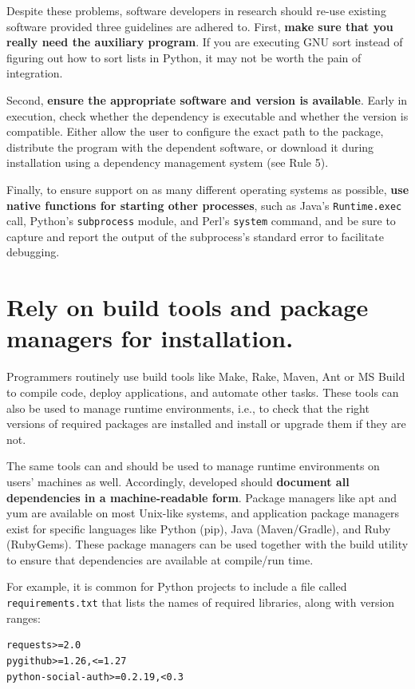 \documentclass[10pt,letterpaper]{article}
\begin{document}
Despite these problems, software developers in research should
re-use existing software provided three guidelines are adhered to.
First, 
\textbf{make sure that you really need the auxiliary program}. If you are
executing GNU sort instead of figuring out how to sort lists in Python,
it may not be worth the pain of integration.

Second, \textbf{ensure the appropriate software and version is available}.
Early in execution, check whether the dependency is executable and whether the
version is compatible.
Either allow the user to
configure the exact path to the package, distribute the program with the
dependent software, or download it during installation using a
dependency management system (see Rule 5). 

Finally, to ensure support on as many different operating systems as
possible, \textbf{use native functions for starting other processes}, such as
Java's \texttt{Runtime.exec} call, Python's \texttt{subprocess} module, and Perl's \texttt{system}
command, and be sure to capture and report the output of the subprocess's standard error
to facilitate debugging.

\section{Rely on build tools and package managers for installation.}

Programmers routinely use build tools like Make, Rake, Maven, Ant or MS Build
to compile code, deploy applications, and automate other tasks.
These tools can also be used to manage runtime environments,
i.e.,
to check that the right versions of required packages are installed
and install or upgrade them if they are not.

The same tools can and should be used to manage runtime environments on users' machines as well.
Accordingly,
developed should
\textbf{document all dependencies in a machine-readable form}.
Package managers like apt and yum are available on most Unix-like systems, and
application package managers exist for specific languages like Python (pip),
Java (Maven/Gradle), and Ruby (RubyGems). These package managers can be used
together with the build utility to ensure that dependencies are available at
compile/run time.

For example, it is common for Python projects to include a file called
\texttt{requirements.txt} that lists the names of required libraries,
along with version ranges:

\begin{verbatim}
requests>=2.0
pygithub>=1.26,<=1.27
python-social-auth>=0.2.19,<0.3
\end{verbatim}
\end{document}
